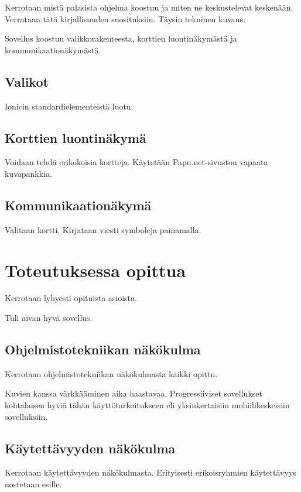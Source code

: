 \documentclass[utf8]{gradu3}
\begin{document}
Kerrotaan mistä palasista ohjelma koostuu ja miten ne keskustelevat keskenään. Verrataan tätä kirjallisuuden suosituksiin.
Täysin tekninen kuvaus.

Sovellus koostuu valikkorakenteesta, korttien luontinäkymästä ja kommunikaationäkymästä.

\section{Valikot}

Ionicin standardielementeistä luotu.

\section{Korttien luontinäkymä}

Voidaan tehdä erikokoisia kortteja. Käytetään Papu.net-sivuston vapaata kuvapankkia.

\section{Kommunikaationäkymä}

Valitaan kortti. Kirjataan viesti symboleja painamalla.

\chapter{Toteutuksessa opittua}

Kerrotaan lyhyesti opituista asioista.

Tuli aivan hyvä sovellus.

\section{Ohjelmistotekniikan näkökulma}

Kerrotaan ohjelmistotekniikan näkökulmasta kaikki opittu.

Kuvien kanssa värkkääminen aika haastavaa. Progressiiviset sovellukset kohtalaisen hyviä tähän käyttötarkoitukseen eli yksinkertaisiin mobiilikeskeisiin sovelluksiin.

\section{Käytettävyyden näkökulma}

Kerrotaan käytettävyyden näkökulmasta. Erityisesti erikoisryhmien käytettävyys nostetaan esille.
\end{document}

